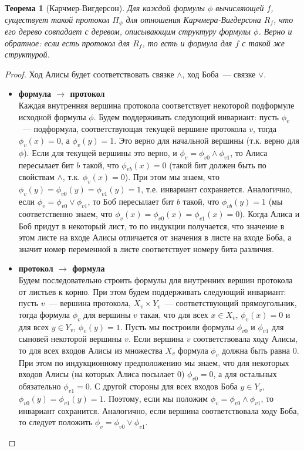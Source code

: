 \documentclass[12pt]{article}
\theoremstyle{definition}
\theoremstyle{plain}
\newtheorem{theorem}{Теорема}[section]
\theoremstyle{remark}
\begin{document}
\begin{theorem}[Карчмер-Вигдерсон]
    Для каждой формулы $\phi$ вычисляющей $f$, существует такой
    протокол $\Pi_\phi$ для отношения Карчмера-Вигдерсона $R_f$, что его дерево
    совпадает с деревом, описывающим структуру формулы $\phi$. 
    Верно и обратное: если есть протокол для $R_f$, 
    то есть и формула для $f$ с такой же структурой.
\end{theorem}
\begin{proof}
    Ход Алисы будет соответствовать связке $\land$,
    ход Боба~--- связке $\lor$. 

    \begin{itemize}
        \item \textbf{формула $\to$ протокол}\\
            Каждая внутренняя вершина протокола соответствует некоторой
            подформуле исходной формулы $\phi$. Будем поддерживать следующий инвариант: пусть $\phi_v$~--- 
            подформула, соответствующая текущей вершине протокола $v$, тогда $\phi_v(x) = 0$, а $\phi_v(y) = 1$.
            Это верно для начальной вершины (т.к. верно для $\phi$). Если для текущей вершины это верно, и
            $\phi_v = \phi_{v0} \land \phi_{v1}$, то Алиса пересылает бит $b$ такой, что
            $\phi_{vb}(x) = 0$ (такой бит должен быть по свойствам $\land$, т.к. $\phi_v(x) = 0$). 
            При этом мы знаем, что $\phi_v(y) = \phi_{v0}(y) = \phi_{v1}(y) = 1$, т.е. инвариант сохраняется.
            Аналогично, если $\phi_v = \phi_{v0} \lor \phi_{v1}$, то Боб пересылает бит $b$ такой, 
            что $\phi_{vb}(y) = 1$ (мы соответственно знаем, что $\phi_v(x) = \phi_{v0}(x) = \phi_{v1}(x) = 0$).
            Когда Алиса и Боб придут в некоторый лист, то по индукции получается, что значение в этом 
            листе на входе Алисы отличается от значения в листе на входе Боба, а значит номер переменной
            в листе соответствует номеру бита различия.

        \item \textbf{протокол $\to$ формула}\\
            Будем последовательно строить формулы для внутренних вершин протокола от листьев к корню.
            При этом будем поддерживать следующий инвариант: пусть $v$~--- вершина протокола, $X_v\times Y_v$~---
            соответствующий прямоугольник, тогда формула $\phi_v$ для вершины $v$ такая, что для всех $x\in X_v$,
            $\phi_v(x) = 0$ и для всех $y\in Y_v$, $\phi_v(y) = 1$. Пусть мы построили формулы $\phi_{v0}$ и
            $\phi_{v1}$ для сыновей некоторой вершины $v$. Если вершина $v$ соответствовала ходу Алисы,
            то для всех входов Алисы из множества $X_v$ формула $\phi_v$ должна быть равна 0. При 
            этом по индукционному предположению мы знаем, что для некоторых входов Алисы (на которых Алиса 
            посылает 0) $\phi_{v0}=0$, а для остальных обязательно $\phi_{v1} = 0$. С другой стороны для всех 
            входов Боба $y\in Y_v$, $\phi_{v0}(y) = \phi_{v1}(y) = 1$. Поэтому, если мы положим 
            $\phi_v = \phi_{v0} \land \phi_{v1}$, то инвариант сохранится. Аналогично, если вершина
            соответствовала ходу Боба, то следует положить $\phi_v = \phi_{v0} \lor \phi_{v1}$.


\end{itemize}
\end{proof}
\end{document}
